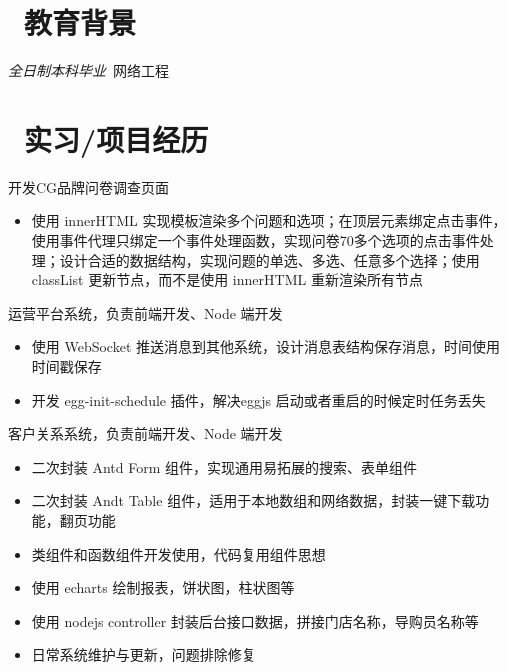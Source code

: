 \documentclass{resume}
\begin{document}


 
\section{\faGraduationCap\ 教育背景}
\textit{全日制本科毕业}\ 网络工程

\section{\faUsers\ 实习/项目经历}

开发CG品牌问卷调查页面
\begin{itemize}
  \item 使用 innerHTML 实现模板渲染多个问题和选项；在顶层元素绑定点击事件，使用事件代理只绑定一个事件处理函数，实现问卷70多个选项的点击事件处理；设计合适的数据结构，实现问题的单选、多选、任意多个选择；使用 classList 更新节点，而不是使用 innerHTML 重新渲染所有节点
\end{itemize}

运营平台系统，负责前端开发、Node 端开发
\begin{itemize}
  \item 使用 WebSocket 推送消息到其他系统，设计消息表结构保存消息，时间使用时间戳保存
  \item 开发 egg-init-schedule 插件，解决eggjs 启动或者重启的时候定时任务丢失
\end{itemize}

客户关系系统，负责前端开发、Node 端开发
\begin{itemize}
  \item 二次封装 Antd Form 组件，实现通用易拓展的搜索、表单组件
  \item 二次封装 Andt Table 组件，适用于本地数组和网络数据，封装一键下载功能，翻页功能
  \item 类组件和函数组件开发使用，代码复用组件思想
  \item 使用 echarts 绘制报表，饼状图，柱状图等
  \item 使用 nodejs controller 封装后台接口数据，拼接门店名称，导购员名称等
  \item 日常系统维护与更新，问题排除修复
\end{itemize}
\end{document}
